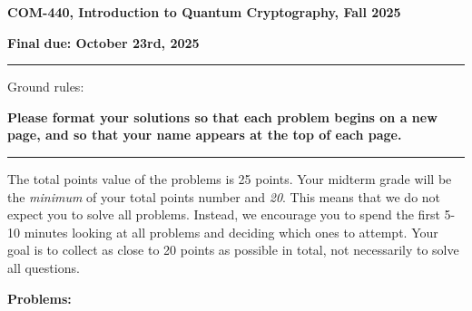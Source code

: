 \documentclass[12pt]{article}
\newcommand{\header}[1]{\begin{center} {\large\bf #1} \end{center}}
\begin{document}
\header{COM-440, Introduction to Quantum Cryptography, Fall 2025}
{\bf Final} \hfill {\bf due: October 23rd, 2025}


\medskip

\hrule

\medskip 

Ground rules: 

{\bf Please
  format your solutions so that each problem begins on a new page, and
  so that your name appears at the top of each page.}

\medskip
\hrule
\medskip

The total points value of the problems is 25 points. Your midterm grade will be the \emph{minimum} of your total points number and \emph{20}. This means that we do not expect you to solve all problems. Instead, we encourage you to spend the first 5-10 minutes looking at all problems and deciding which ones to attempt. Your goal is to collect as close to 20 points as possible in total, not necessarily to solve all questions. 
 
\medskip
{\bf Problems:}
\end{document}
